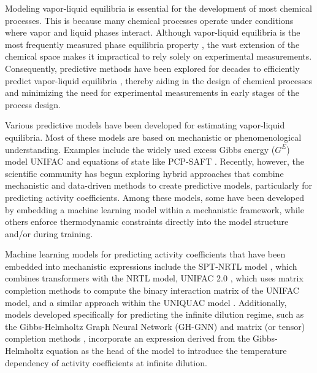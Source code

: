 \label{sec:introduction}

Modeling vapor-liquid equilibria is essential for the development of most chemical processes. This is because many chemical processes operate under conditions where vapor and liquid phases interact. Although vapor-liquid equilibria is the most frequently measured phase equilibria property \cite{DDBST}, the vast extension of the chemical space makes it impractical to rely solely on experimental measurements. Consequently, predictive methods have been explored for decades to efficiently predict vapor-liquid equilibria \cite{gmehling2019chemical}, thereby aiding in the design of chemical processes and minimizing the need for experimental measurements in early stages of the process design.

 Various predictive models have been developed for estimating vapor-liquid equilibria. Most of these models are based on mechanistic or phenomenological understanding. Examples include the widely used excess Gibbs energy ($G^E$) model UNIFAC \cite{constantinescu2016further} and equations of state like PCP-SAFT \cite{gross2006equation}. Recently, however, the scientific community has begun exploring hybrid approaches that combine mechanistic and data-driven methods to create predictive models, particularly for predicting activity coefficients. Among these models, some have been developed by embedding a machine learning model within a mechanistic framework, while others enforce thermodynamic constraints directly into the model structure and/or during training.

Machine learning models for predicting activity coefficients that have been embedded into mechanistic expressions include the SPT-NRTL model \cite{winter2023spt}, which combines transformers with the NRTL model, UNIFAC 2.0 \cite{hayer2025advancing}, which uses matrix completion methods to compute the binary interaction matrix of the UNIFAC model, and a similar approach within the UNIQUAC model \cite{jirasek2022making}. Additionally, models developed specifically for predicting the infinite dilution regime, such as the Gibbs-Helmholtz Graph Neural Network (GH-GNN) \cite{medina2023gibbs} and matrix (or tensor) completion methods \cite{damay2021predicting, damay2023predicting}, incorporate an expression derived from the Gibbs-Helmholtz equation as the head of the model to introduce the temperature dependency of activity coefficients at infinite dilution.

